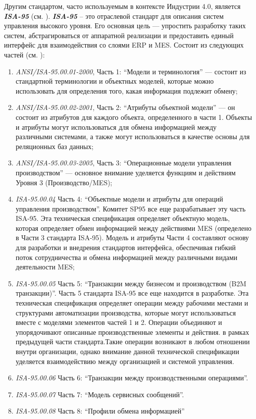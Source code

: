 Другим стандартом, часто используемым в контексте Индустрии 4.0, является \textbf{\textit{ISA-95}} (см. ). \textbf{\textit{ISA-95}} -- это отраслевой стандарт для описания систем управления высокого уровня. Его основная цель — упростить разработку таких систем, абстрагироваться от аппаратной реализации и предоставить единый интерфейс для взаимодействия со слоями ERP и MES. Состоит из следующих частей (см. ):
\begin{enumerate}
    \item \textit {ANSI/ISA-95.00.01-2000}, Часть 1: ``Модели и терминология'' — состоит из стандартной терминологии и объектных моделей, которые можно использовать для определения того, какая информация подлежит обмену;
    \item \textit {ANSI/ISA-95.00.02-2001}, Часть 2: ``Атрибуты объектной модели'' — он состоит из атрибутов для каждого объекта, определенного в части 1. Объекты и атрибуты могут использоваться для обмена информацией между различными системами, а также могут использоваться в качестве основы для реляционных баз данных;
    \item \textit {ANSI/ISA-95.00.03-2005}, Часть 3: ``Операционные модели управления производством'' — основное внимание уделяется функциям и действиям Уровня 3 (Производство/MES);
    \item \textit {ISA-95.00.04} Часть 4: ``Объектные модели и атрибуты для операций управления производством''. Комитет SP95 все еще разрабатывает эту часть ISA-95. Эта техническая спецификация определяет объектную модель, которая определяет обмен информацией между действиями MES (определено в Части 3 стандарта ISA-95). Модель и атрибуты Части 4 составляют основу для разработки и внедрения стандартов интерфейса, обеспечивая гибкий поток сотрудничества и обмена информацией между различными видами деятельности MES;
    \item \textit {ISA-95.00.05} Часть 5: ``Транзакции между бизнесом и производством (B2M транзакции)''. Часть 5 стандарта ISA-95 все еще находится в разработке. Эта техническая спецификация определяет операции между рабочими местами и структурами автоматизации производства, которые могут использоваться вместе с моделями элементов частей 1 и 2. Операции объединяют и упорядочивают описанные производственные элементы и действия. в рамках предыдущей части стандарта.Такие операции возникают в любом отношении внутри организации, однако внимание данной технической спецификации уделяется взаимодействию между организацией и системой управления.
    \item \textit {ISA-95.00.06} Часть 6: ``Транзакции между производственными операциями''.
    \item \textit {ISA-95.00.07} Часть 7: ``Модель сервисных сообщений''.
    \item \textit {ISA-95.00.08} Часть 8: ``Профили обмена информацией''
\end{enumerate}

